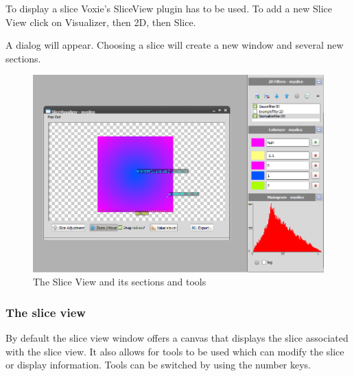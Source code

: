 To display a slice Voxie's SliceView plugin has to be used. To add a new Slice View click on Visualizer, then 2D, then Slice.

A dialog will appear. Choosing a slice will create a new window and several new sections.

\begin{figure}[h]
	\caption{The Slice View and its sections and tools}
	\centering
	\includegraphics[width=1.0\textwidth]{img/2d/sliceview.png}
\end{figure}


\subsubsection{The slice view}

By default the slice view window offers a canvas that displays the slice associated with the slice view. It also allows for tools to be used which can modify the slice or display information. Tools can be switched by using the number keys.

